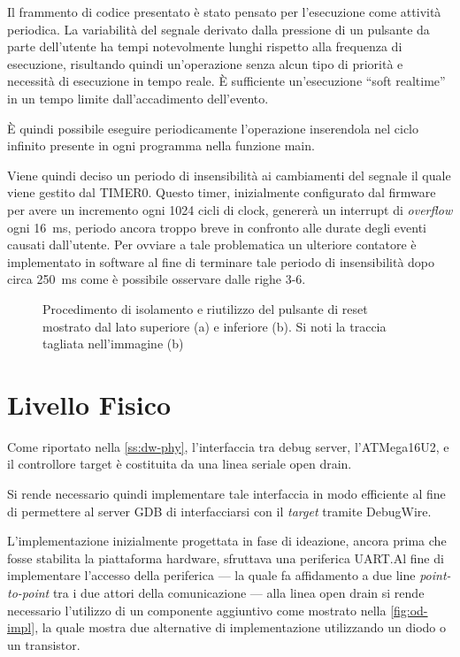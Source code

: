 Il frammento di codice presentato è stato pensato per l'esecuzione come attività periodica. La variabilità del segnale derivato dalla pressione di un pulsante da parte dell'utente ha tempi notevolmente lunghi rispetto alla frequenza di esecuzione, risultando quindi un'operazione senza alcun tipo di priorità e necessità di esecuzione in tempo reale. È sufficiente un'esecuzione ``soft realtime'' in un tempo limite dall'accadimento dell'evento.

È quindi possibile eseguire periodicamente l'operazione inserendola nel ciclo infinito presente in ogni programma nella funzione main.

Viene quindi deciso un periodo di insensibilità ai cambiamenti del segnale il quale viene gestito dal TIMER0. Questo timer, inizialmente configurato dal firmware per avere un incremento ogni 1024 cicli di clock, genererà un interrupt di \textit{overflow} ogni \SI{16}{\milli\second}, periodo ancora troppo breve in confronto alle durate degli eventi causati dall'utente. Per ovviare a tale problematica un ulteriore contatore è implementato in software al fine di terminare tale periodo di insensibilità dopo circa \SI{250}{\milli\second} come è possibile osservare dalle righe 3-6.\@

\begin{figure}[h]
    \centering
    \hspace{8mm}

    \caption[]{Procedimento di isolamento e riutilizzo del pulsante di reset mostrato dal lato superiore (a) e inferiore (b). Si noti la traccia tagliata nell'immagine (b)}\label{fig:rst-rewire}
\end{figure}

\section{Livello Fisico}

Come riportato nella \cref{ss:dw-phy}, l'interfaccia tra debug server, l'ATMega16U2, e il controllore target è costituita da una linea seriale open drain.

Si rende necessario quindi implementare tale interfaccia in modo efficiente al fine di permettere al server GDB di interfacciarsi con il \textit{target} tramite DebugWire.

L'implementazione inizialmente progettata in fase di ideazione, ancora prima che fosse stabilita la piattaforma hardware, sfruttava una periferica UART.\@ Al fine di implementare l'accesso della periferica --- la quale fa affidamento a due line \textit{point-to-point} tra i due attori della comunicazione --- alla linea open drain si rende necessario l'utilizzo di un componente aggiuntivo come mostrato nella \cref{fig:od-impl}, la quale mostra due alternative di implementazione utilizzando un diodo o un transistor. 

